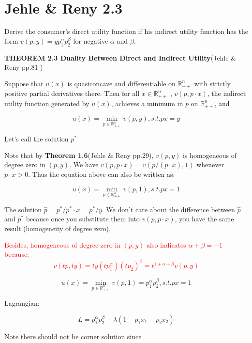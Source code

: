 \documentclass{article}
\newcommand{\R}{\mathbb{R}}
\begin{document}
\section{Jehle \& Reny 2.3}
Derive the consumer’s direct utility function if his indirect utility function has the form $v(p, y) =
yp_1^\alpha p_2^\beta$ for negative $\alpha$ and $\beta$.

\begin{mdframed}[backgroundcolor=blue!20,linecolor=white]

\textbf{THEOREM 2.3 Duality Between Direct and Indirect Utility}(Jehle \& Reny pp.81 )

Suppose that $u(x)$ is quasiconcave and differentiable on $\R^n_{++}$ with strictly positive partial derivatives there. Then for all $x \in \R^n_{++}$ , $v(p, p \cdot x)$, the indirect utility function generated
by $u(x)$, achieves a minimum in $p$ on $\R^n_{++}$, and

$$u(x) = \min_{p \in \R^n_{++}}  v(p,y), s.t. px=y$$

Let's call the solution $p^*$

Note that by \textbf{Theorem 1.6}(Jehle \& Reny pp.29), $v(p, y)$ is homogeneous of degree zero in $(p, y)$. We have $v(p, p \cdot x) = v(p/(p \cdot x), 1)$ whenever $p \cdot x > 0$. Thus the equation above can also be written as:

$$u(x) = \min_{p \in \R^n_{++}}  v(p,1), s.t. px=1$$

The solution $\hat{p} = p^* / p^* \cdot x = p^* / y$. We don't care about the difference between $\hat{p}$ and $p^*$ because once you substitute them into $v(p,p\cdot x)$, you have the same result (homogeneity of degree zero).

\vspace{3mm}

\textcolor{red}{Besides, homogeneous of degree zero in $(p, y)$ also indicates $\alpha + \beta = -1$ because:
$$v(tp, ty) =
ty(tp_1^\alpha) (tp_2)^\beta = t^{1+\alpha + \beta}v(p, y)$$}

\end{mdframed}

$$u(x) = \min_{p \in \R^n_{++}}  v(p, 1) =
p_1^\alpha p_2^\beta, s.t. px=1$$

Lagrangian:

$$L = p_1^\alpha p_2^\beta + \lambda (1- p_1x_1 - p_2x_2)$$

Note there should not be corner solution since
\end{document}
